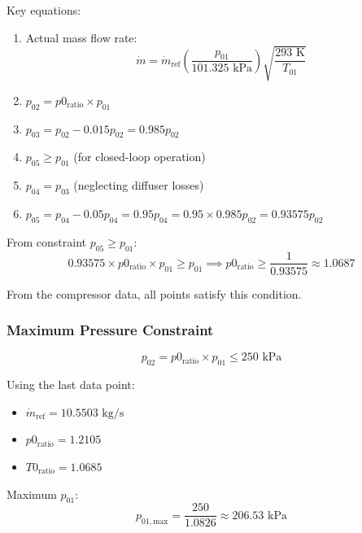 \documentclass[12pt]{article}
\begin{document}
Key equations:
\begin{enumerate}
    \item Actual mass flow rate:
    \begin{equation}
        \dot{m} = \dot{m}_{\text{ref}} \left(\frac{p_{01}}{101.325 \text{ kPa}}\right) \sqrt{\frac{293 \text{ K}}{T_{01}}}
    \end{equation}
    
    \item $p_{02} = p0_{\text{ratio}} \times p_{01}$
    
    \item $p_{03} = p_{02} - 0.015p_{02} = 0.985p_{02}$
    
    \item $p_{05} \geq p_{01}$ (for closed-loop operation)
    
    \item $p_{04} = p_{03}$ (neglecting diffuser losses)
    
    \item $p_{05} = p_{04} - 0.05p_{04} = 0.95p_{04} = 0.95 \times 0.985p_{02} = 0.93575p_{02}$
\end{enumerate}

From constraint $p_{05} \geq p_{01}$:
\begin{equation}
    0.93575 \times p0_{\text{ratio}} \times p_{01} \geq p_{01} \implies p0_{\text{ratio}} \geq \frac{1}{0.93575} \approx 1.0687
\end{equation}

From the compressor data, all points satisfy this condition.

\subsubsection*{Maximum Pressure Constraint}
\begin{equation}
    p_{02} = p0_{\text{ratio}} \times p_{01} \leq 250 \text{ kPa}
\end{equation}

Using the last data point:
\begin{itemize}
    \item $\dot{m}_{\text{ref}} = 10.5503 \text{ kg/s}$
    \item $p0_{\text{ratio}} = 1.2105$
    \item $T0_{\text{ratio}} = 1.0685$
\end{itemize}

Maximum $p_{01}$:
\begin{equation}
    p_{01,\text{max}} = \frac{250}{1.0826} \approx 206.53 \text{ kPa}
\end{equation}
\end{document}
